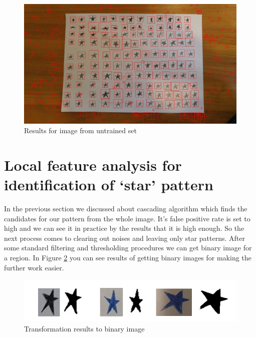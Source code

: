 \begin{figure}[h]
    \centering
    \includegraphics[width=\textwidth]{Figures/res_for_image_from_untrained_set}
    \caption{Results for image from untrained set}
    \label{fig:res_for_image_from_untrained_set}
\end{figure}

\section{Local feature analysis for identification of ‘star’ pattern}
In the previous section we discussed about cascading algorithm which finds the candidates for our pattern from the whole image. It’s false positive rate is set to high and we can see it in practice by the results that it is high enough. So the next process comes to clearing out noises and leaving only star patterns. After some standard filtering and thresholding procedures \cite{Hendeby} we can get binary image for a region. In Figure \ref{fig:transformation_to_binary} you can see results of getting binary images for making the further work easier.

\begin{figure}[h]
    \centering
    \includegraphics[width=\textwidth]{Figures/transformation_to_binary}
    \caption{Transformation results to binary image }
    \label{fig:transformation_to_binary}
\end{figure}

